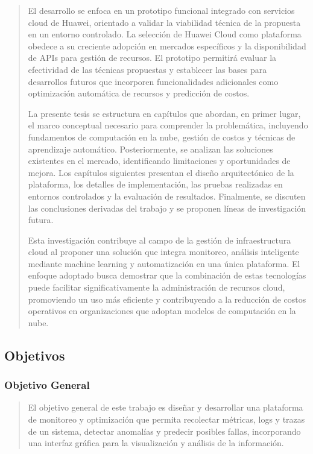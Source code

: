 \documentclass[
]{article}
\begin{document}
\begin{quote}
El desarrollo se enfoca en un prototipo funcional integrado con
servicios cloud de Huawei, orientado a validar la viabilidad técnica de
la propuesta en un entorno controlado. La selección de Huawei Cloud como
plataforma obedece a su creciente adopción en mercados específicos y la
disponibilidad de APIs para gestión de recursos. El prototipo permitirá
evaluar la efectividad de las técnicas propuestas y establecer las bases
para desarrollos futuros que incorporen funcionalidades adicionales como
optimización automática de recursos y predicción de costos.

La presente tesis se estructura en capítulos que abordan, en primer
lugar, el marco conceptual necesario para comprender la problemática,
incluyendo fundamentos de computación en la nube, gestión de costos y
técnicas de aprendizaje automático. Posteriormente, se analizan las
soluciones existentes en el mercado, identificando limitaciones y
oportunidades de mejora. Los capítulos siguientes presentan el diseño
arquitectónico de la plataforma, los detalles de implementación, las
pruebas realizadas en entornos controlados y la evaluación de
resultados. Finalmente, se discuten las conclusiones derivadas del
trabajo y se proponen líneas de investigación futura.

Esta investigación contribuye al campo de la gestión de infraestructura
cloud al proponer una solución que integra monitoreo, análisis
inteligente mediante machine learning y automatización en una única
plataforma. El enfoque adoptado busca demostrar que la combinación de
estas tecnologías puede facilitar significativamente la administración
de recursos cloud, promoviendo un uso más eficiente y contribuyendo a la
reducción de costos operativos en organizaciones que adoptan modelos de
computación en la nube.
\end{quote}

\subsection{Objetivos}\label{objetivos}

\subsubsection{Objetivo General}\label{objetivo-general}

\begin{quote}
El objetivo general de este trabajo es diseñar y desarrollar una
plataforma de monitoreo y optimización que permita recolectar métricas,
logs y trazas de un sistema, detectar anomalías y predecir posibles
fallas, incorporando una interfaz gráfica para la visualización y
análisis de la información.
\end{quote}
\end{document}
